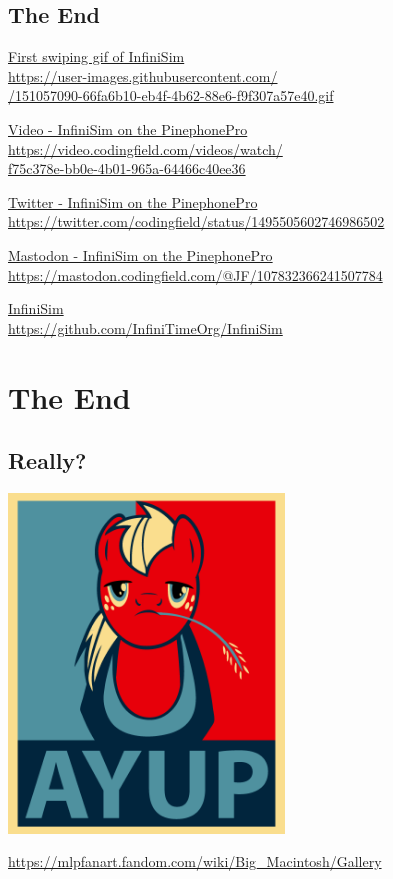 \documentclass{beamer}
\begin{document}
\subsection{The End}
\begin{frame}{}

  \href{https://user-images.githubusercontent.com/9076163/151057090-66fa6b10-eb4f-4b62-88e6-f9f307a57e40.gif}{
    First swiping gif of InfiniSim\\
  \quad \small https://user-images.githubusercontent.com/\\
  \quad{}/151057090-66fa6b10-eb4f-4b62-88e6-f9f307a57e40.gif}

  \medskip
  \href{https://video.codingfield.com/videos/watch/f75c378e-bb0e-4b01-965a-64466c40ee36}{
    Video - InfiniSim on the PinephonePro\\
  \quad \small https://video.codingfield.com/videos/watch/\\
  \quad\quad f75c378e-bb0e-4b01-965a-64466c40ee36}

  \medskip
  \href{https://twitter.com/codingfield/status/1495505602746986502}{
    Twitter - InfiniSim on the PinephonePro\\
  \quad \small https://twitter.com/codingfield/status/1495505602746986502}

  \medskip
  \href{https://mastodon.codingfield.com/@JF/107832366241507784}{
    Mastodon - InfiniSim on the PinephonePro\\
  \quad \small https://mastodon.codingfield.com/@JF/107832366241507784}

  \medskip
  \href{https://github.com/InfiniTimeOrg/InfiniSim}{
    InfiniSim\\
  \quad \small https://github.com/InfiniTimeOrg/InfiniSim}

\end{frame}

\section{The End}
\subsection{Really?}
\begin{frame}{}
  \centering\includegraphics[width=0.55\textwidth]{../pony_big_mac_ayup}

  \small \href{https://mlpfanart.fandom.com/wiki/Big_Macintosh/Gallery}{https://mlpfanart.fandom.com/wiki/Big\_Macintosh/Gallery}
\end{frame}
\end{document}
